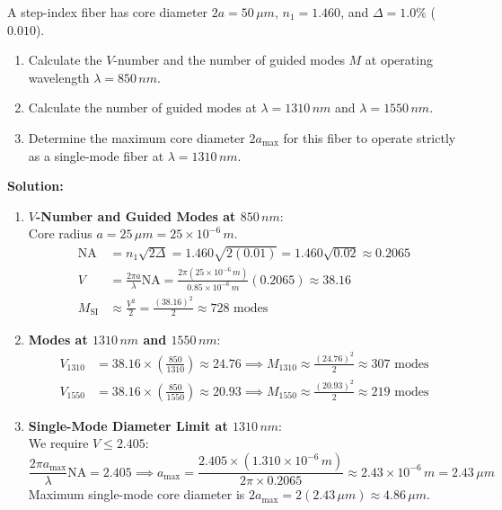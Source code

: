 \begin{example}
A step-index fiber has core diameter $2a = 50\,\si{\mu m}$, $n_1 = 1.460$, and $\Delta = 1.0\%$ ($0.010$).
\begin{enumerate}
    \item Calculate the $V$-number and the number of guided modes $M$ at operating wavelength $\lambda = 850\,\si{nm}$.
    \item Calculate the number of guided modes at $\lambda = 1310\,\si{nm}$ and $\lambda = 1550\,\si{nm}$.
    \item Determine the maximum core diameter $2a_{\text{max}}$ for this fiber to operate strictly as a single-mode fiber at $\lambda = 1310\,\si{nm}$.
\end{enumerate}

\textbf{Solution:}
\begin{enumerate}
    \item \textbf{$V$-Number and Guided Modes at $850\,\si{nm}$}:\\
    Core radius $a = 25\,\si{\mu m} = 25 \times 10^{-6}\,\si{m}$.
    \begin{align*}
        \text{NA} &= n_1 \sqrt{2\Delta} = 1.460 \sqrt{2(0.01)} = 1.460 \sqrt{0.02} \approx 0.2065 \\
        V &= \frac{2\pi a}{\lambda} \text{NA} = \frac{2\pi (25 \times 10^{-6}\,\si{m})}{0.85 \times 10^{-6}\,\si{m}} (0.2065) \approx 38.16 \\
        M_{\text{SI}} &\approx \frac{V^2}{2} = \frac{(38.16)^2}{2} \approx 728 \text{ modes}
    \end{align*}
    
    \item \textbf{Modes at $1310\,\si{nm}$ and $1550\,\si{nm}$}:
    \begin{align*}
        V_{1310} &= 38.16 \times \left(\frac{850}{1310}\right) \approx 24.76 \implies M_{1310} \approx \frac{(24.76)^2}{2} \approx 307 \text{ modes} \\
        V_{1550} &= 38.16 \times \left(\frac{850}{1550}\right) \approx 20.93 \implies M_{1550} \approx \frac{(20.93)^2}{2} \approx 219 \text{ modes}
    \end{align*}
    
    \item \textbf{Single-Mode Diameter Limit at $1310\,\si{nm}$}:\\
    We require $V \le 2.405$:
    \begin{equation*}
        \frac{2\pi a_{\text{max}}}{\lambda}\text{NA} = 2.405 \implies a_{\text{max}} = \frac{2.405 \times (1.310 \times 10^{-6}\,\si{m})}{2\pi \times 0.2065} \approx 2.43 \times 10^{-6}\,\si{m} = 2.43\,\si{\mu m}
    \end{equation*}
    Maximum single-mode core diameter is $2a_{\text{max}} = 2(2.43\,\si{\mu m}) \approx 4.86\,\si{\mu m}$.
\end{enumerate}
\end{example}

